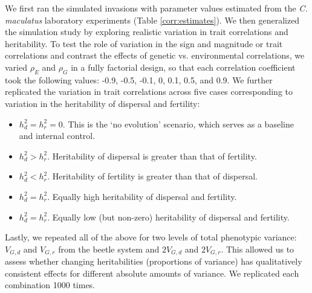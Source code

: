 \documentclass[11pt]{article}
\begin{document}
We first ran the simulated invasions with parameter values estimated from the \textit{C. maculatus} laboratory experiments (Table \ref{corr:estimates}).
We then generalized the simulation study by exploring realistic variation in trait correlations and heritability.
To test the role of variation in the sign and magnitude or trait correlations and contrast the effects of genetic vs. environmental correlations, we varied $\rho_{E}$ and $\rho_{G}$ in a fully factorial design, so that each correlation coefficient took the following values: -0.9, -0.5, -0.1, 0, 0.1, 0.5, and 0.9.
We further replicated the variation in trait correlations across five cases corresponding to variation in the heritability of dispersal and fertility:
\begin{itemize}
  \item $h^{2}_d = h^{2}_r = 0$. This is the `no evolution' scenario, which serves as a baseline and internal control.
  \item $h^{2}_d > h^{2}_r$. Heritability of dispersal is greater than that of fertility.
  \item $h^{2}_d < h^{2}_r$. Heritability of fertility is greater than that of dispersal.
  \item $h^{2}_d = h^{2}_r$. Equally high heritability of dispersal and fertility.
  \item $h^{2}_d = h^{2}_r$. Equally low (but non-zero) heritability of dispersal and fertility.
\end{itemize}
Lastly, we repeated all of the above for two levels of total phenotypic variance: $V_{G,d}$ and $V_{G,r}$ from the beetle system and $2V_{G,d}$ and $2V_{G,r}$.
This allowed us to assess whether changing heritabilities (proportions of variance) has qualitatively consistent effects for different absolute amounts of variance.
We replicated each combination 1000 times.

\renewcommand{\thetable}{\arabic{table}}
\setcounter{table}{0}
\end{document}
